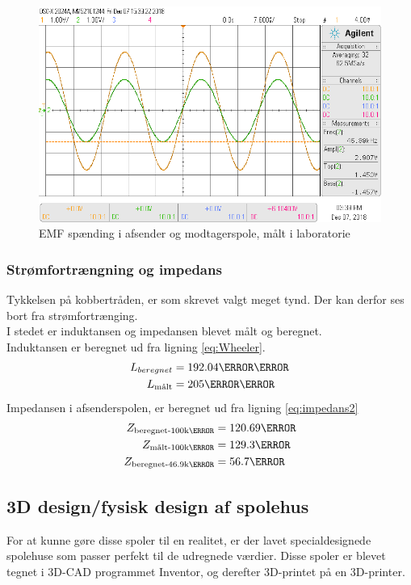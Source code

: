\begin{figure}[h!]
	\centering
	\includegraphics[width=1\textwidth]{billeder/vin_vout_png.png}
	\caption{EMF spænding i afsender og modtagerspole, målt i laboratorie}
	\label{fig:EMF_spole_lab}
\end{figure}
\newpage
\subsubsection{Strømfortrængning og impedans}
Tykkelsen på kobbertråden, er som skrevet valgt meget tynd.
Der kan derfor ses bort fra strømfortrænging.\\
I stedet er induktansen og impedansen blevet målt og beregnet.\\
Induktansen er beregnet ud fra ligning \ref{eq:Wheeler}.
\begin{align}
	 L_{beregnet} &= 192.04\micro\henry\\
     L_{\text{målt}} &= 205\micro\henry
\end{align}
Impedansen i afsenderspolen, er beregnet ud fra ligning \ref{eq:impedans2}
\begin{align}
	 Z_{\text{beregnet-100k\hertz}}&=120.69\ohm\\
	 Z_{\text{målt-100k\hertz}}&=129.3\ohm\\
	 Z_{\text{beregnet-46.9k\hertz}}&= 56.7\ohm               
\end{align}
\subsection{3D design/fysisk design af spolehus}\label{sec:3D_design}
For at kunne gøre disse spoler til en realitet, er der lavet specialdesignede spolehuse som passer perfekt til de udregnede værdier. Disse spoler er blevet tegnet i 3D-CAD programmet Inventor, og derefter 3D-printet på en 3D-printer. \\


